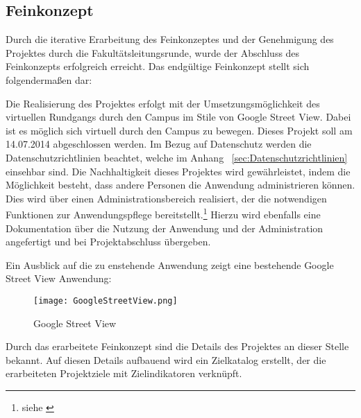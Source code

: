 \subsection{Feinkonzept}
\label{sec:Feinkonzept}

Durch die iterative Erarbeitung des Feinkonzeptes und der Genehmigung des
Projektes durch die Fakultätsleitungsrunde, wurde der Abschluss des Feinkonzepts
erfolgreich erreicht. Das endgültige Feinkonzept stellt sich folgendermaßen dar:

Die Realisierung des Projektes erfolgt mit der Umsetzungsmöglichkeit des
virtuellen Rundgangs durch den Campus im Stile von Google Street View. Dabei ist
es möglich sich virtuell durch den Campus zu bewegen. Dieses Projekt soll am
14.07.2014 abgeschlossen werden. Im Bezug auf Datenschutz werden die
Datenschutzrichtlinien beachtet, welche im Anhang ~\ref{sec:Datenschutzrichtlinien} einsehbar sind. Die
Nachhaltigkeit dieses Projektes wird gewährleistet, indem die Möglichkeit
besteht, dass andere Personen die Anwendung administrieren können. Dies wird über
einen Administrationsbereich realisiert, der die notwendigen Funktionen zur
Anwendungspflege bereitstellt.\footnote{siehe \citet{lastenheft2013}} Hierzu
wird ebenfalls eine Dokumentation über die Nutzung der Anwendung und der
Administration angefertigt und bei Projektabschluss übergeben.

Ein Ausblick auf die zu enstehende Anwendung zeigt eine bestehende 
Google Street View Anwendung:

\clearpage
\begin{figure}[htb] 
\centering
\texttt{[image: GoogleStreetView.png]}
\caption[Google Street View]{Google Street View\protect\footnotemark}
\label{fig:GoogleStreetView}
\end{figure}

Durch das erarbeitete Feinkonzept sind die Details des Projektes an dieser Stelle bekannt.
Auf diesen Details aufbauend wird ein Zielkatalog erstellt, der die erarbeiteten Projektziele
mit Zielindikatoren verknüpft.